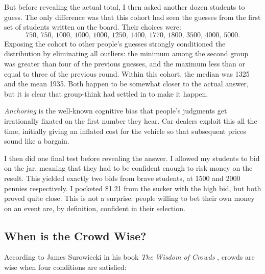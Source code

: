 \documentclass[10pt]{article}
\begin{document}
But before revealing the actual total, I then asked another dozen students to guess. The only difference was that this cohort had seen the guesses from the first set of students written on the board. Their choices were:
$$
750, \, 750, \, 1000, \, 1000, \, 1000, \, 1250, \, 1400, \, 1770, \, 1800, \, 3500, \, 4000, \, 5000.
$$
Exposing the cohort to other people's guesses strongly conditioned the distribution by eliminating all outliers: the minimum among the second group was greater than four of the previous guesses, and the maximum less than or equal to three of the previous round. Within this cohort, the median was 1325 and the mean 1935. Both happen to be somewhat closer to the actual answer, but it is clear that group-think had settled in to make it happen.

\textit{Anchoring} is the well-known cognitive bias that people's judgments get irrationally fixated on the first number they hear. Car dealers exploit this all the time, initially giving an inflated cost for the vehicle so that subsequent prices sound like a bargain.

I then did one final test before revealing the answer. I allowed my students to bid on the jar, meaning that they had to be confident enough to risk money on the result. This yielded exactly two bids from brave students, at 1500 and 2000 pennies respectively. I pocketed \$1.21 from the sucker with the high bid, but both proved quite close. This is not a surprise: people willing to bet their own money on an event are, by definition, confident in their selection.

\subsection{When is the Crowd Wise?}

According to James Surowiecki in his book \textit{The Wisdom of Crowds} \cite{Sur05}, crowds are wise when four conditions are satisfied:
\end{document}
